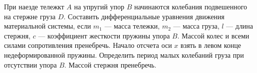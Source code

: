 При наезде тележкт $A$ на упругий упор $B$ начинаются колебания
подвешенного на стержне груза $D$.
Составить дифференциальные уравнения движения материальной системы,
если $m_1$ --- масса тележки, $m_2$ --- масса груза, $l$ --- длина стержня,
$c$ --- коэффициент жесткости пружины упора $B$.
Массой колес и всеми силами сопротивления пренебречь.
Начало отсчета оси $x$ взять в левом конце недеформированной пружины.
Определить период малых колебаний груза при отсутствии упора $B$.
Массой стержня пренебречь.
